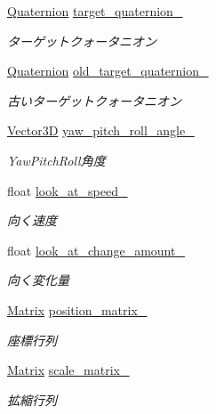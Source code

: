 \begin{DoxyCompactItemize}
\mbox{\hyperlink{_vector3_d_8h_a3ee38c9c46d9851e33a9a1113328dafc}{Quaternion}} \mbox{\hyperlink{class_transform_acb5b22818929f01f4765a39f2da01579}{target\+\_\+quaternion\+\_\+}}
\begin{DoxyCompactList}\small\item\em ターゲットクォータニオン \end{DoxyCompactList}\item 
\mbox{\hyperlink{_vector3_d_8h_a3ee38c9c46d9851e33a9a1113328dafc}{Quaternion}} \mbox{\hyperlink{class_transform_a52fa2db52356033f42908fde94f9cb28}{old\+\_\+target\+\_\+quaternion\+\_\+}}
\begin{DoxyCompactList}\small\item\em 古いターゲットクォータニオン \end{DoxyCompactList}\item 
\mbox{\hyperlink{class_vector3_d}{Vector3D}} \mbox{\hyperlink{class_transform_acf33e8171e9803bebe3aba14dbedc90e}{yaw\+\_\+pitch\+\_\+roll\+\_\+angle\+\_\+}}
\begin{DoxyCompactList}\small\item\em Yaw\+Pitch\+Roll角度 \end{DoxyCompactList}\item 
float \mbox{\hyperlink{class_transform_a762490e0b35915244f767d618bb875b4}{look\+\_\+at\+\_\+speed\+\_\+}}
\begin{DoxyCompactList}\small\item\em 向く速度 \end{DoxyCompactList}\item 
float \mbox{\hyperlink{class_transform_acda35632e3895b925eaae4625c564b5f}{look\+\_\+at\+\_\+change\+\_\+amount\+\_\+}}
\begin{DoxyCompactList}\small\item\em 向く変化量 \end{DoxyCompactList}\item 
\mbox{\hyperlink{class_matrix}{Matrix}} \mbox{\hyperlink{class_transform_a52dc8d953e340e21ecd0a56fb5cb5a09}{position\+\_\+matrix\+\_\+}}
\begin{DoxyCompactList}\small\item\em 座標行列 \end{DoxyCompactList}\item 
\mbox{\hyperlink{class_matrix}{Matrix}} \mbox{\hyperlink{class_transform_a052a5c220aac57fdb9f8c879f613de84}{scale\+\_\+matrix\+\_\+}}
\begin{DoxyCompactList}\small\item\em 拡縮行列 \end{DoxyCompactList}\item 

\end{DoxyCompactItemize}
